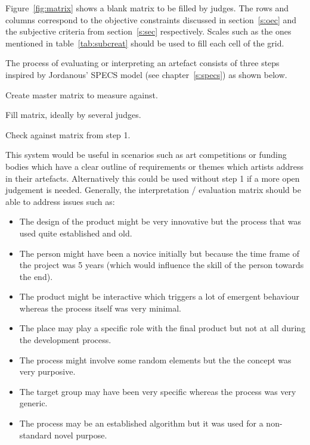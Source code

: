 Figure~\ref{fig:matrix} shows a blank matrix to be filled by judges. The rows and columns correspond to the objective constraints discussed in section~\ref{s:oec} and the subjective criteria from section~\ref{s:sec} respectively. Scales such as the ones mentioned in table~\ref{tab:subcreat} should be used to fill each cell of the grid. 

The process of evaluating or interpreting an artefact consists of three steps inspired by Jordanous' \ac{SPECS} model (see chapter~\ref{s:specs}) as shown below.

\begin{description}[leftmargin=2cm]
  \item[Step 1] Create master matrix to measure against.
  \item[Step 2] Fill matrix, ideally by several judges.
  \item[Step 3] Check against matrix from step 1.
\end{description}

This system would be useful in scenarios such as art competitions or funding bodies which have a clear outline of requirements or themes which artists address in their artefacts. Alternatively this could be used without step 1 if a more open judgement is needed. Generally, the interpretation / evaluation matrix should be able to address issues such as:

\begin{itemize}
  \item The design of the product might be very innovative but the process that was used quite established and old.
  \item The person might have been a novice initially but because the time frame of the project was \num{5} years (which would influence the skill of the person towards the end).
  \item The product might be interactive which triggers a lot of emergent behaviour whereas the process itself was very minimal.
  \item The place may play a specific role with the final product but not at all during the development process.
  \item The process might involve some random elements but the the concept was very purposive.
  \item The target group may have been very specific whereas the process was very generic.
  \item The process may be an established algorithm but it was used for a non-standard novel purpose.
\end{itemize}


